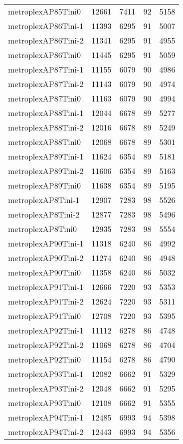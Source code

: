 \begin{longtable}{lrrrr}
metroplexAP85Tini0 & 12661 & 7411 & 92 & 5158 \\
metroplexAP86Tini-1 & 11393 & 6295 & 91 & 5007 \\
metroplexAP86Tini-2 & 11341 & 6295 & 91 & 4955 \\
metroplexAP86Tini0 & 11445 & 6295 & 91 & 5059 \\
metroplexAP87Tini-1 & 11155 & 6079 & 90 & 4986 \\
metroplexAP87Tini-2 & 11143 & 6079 & 90 & 4974 \\
metroplexAP87Tini0 & 11163 & 6079 & 90 & 4994 \\
metroplexAP88Tini-1 & 12044 & 6678 & 89 & 5277 \\
metroplexAP88Tini-2 & 12016 & 6678 & 89 & 5249 \\
metroplexAP88Tini0 & 12068 & 6678 & 89 & 5301 \\
metroplexAP89Tini-1 & 11624 & 6354 & 89 & 5181 \\
metroplexAP89Tini-2 & 11606 & 6354 & 89 & 5163 \\
metroplexAP89Tini0 & 11638 & 6354 & 89 & 5195 \\
metroplexAP8Tini-1 & 12907 & 7283 & 98 & 5526 \\
metroplexAP8Tini-2 & 12877 & 7283 & 98 & 5496 \\
metroplexAP8Tini0 & 12935 & 7283 & 98 & 5554 \\
metroplexAP90Tini-1 & 11318 & 6240 & 86 & 4992 \\
metroplexAP90Tini-2 & 11274 & 6240 & 86 & 4948 \\
metroplexAP90Tini0 & 11358 & 6240 & 86 & 5032 \\
metroplexAP91Tini-1 & 12666 & 7220 & 93 & 5353 \\
metroplexAP91Tini-2 & 12624 & 7220 & 93 & 5311 \\
metroplexAP91Tini0 & 12708 & 7220 & 93 & 5395 \\
metroplexAP92Tini-1 & 11112 & 6278 & 86 & 4748 \\
metroplexAP92Tini-2 & 11068 & 6278 & 86 & 4704 \\
metroplexAP92Tini0 & 11154 & 6278 & 86 & 4790 \\
metroplexAP93Tini-1 & 12082 & 6662 & 91 & 5329 \\
metroplexAP93Tini-2 & 12048 & 6662 & 91 & 5295 \\
metroplexAP93Tini0 & 12108 & 6662 & 91 & 5355 \\
metroplexAP94Tini-1 & 12485 & 6993 & 94 & 5398 \\
metroplexAP94Tini-2 & 12443 & 6993 & 94 & 5356 \\

\end{longtable}
